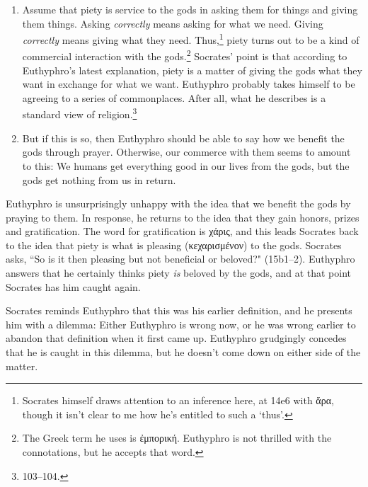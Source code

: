 \documentclass[11pt]{article}
\begin{document}
\begin{enumerate}

    \item Assume that piety is service to the gods in asking them for
        things and giving them things.  Asking \emph{correctly} means
        asking for what we need.  Giving \emph{correctly} means giving what
        they need.  Thus,\footnote{Socrates himself draws attention to an
        inference here, at 14e6 with {\g ἄρα}, though it isn't clear to
        me how he's entitled to such a `thus'.} piety turns out to be
        a kind of commercial interaction with the gods.\footnote{The Greek
        term he uses is {\g ἐμπορική}.  Euthyphro is not thrilled with
        the connotations, but he accepts that word.}  Socrates' point is
        that according to Euthyphro's latest explanation, piety is a matter
        of giving the gods what they want in exchange for what we want.
        Euthyphro probably takes himself to be agreeing to a series of
        commonplaces.  After all, what he describes is a standard
         view of religion.\footnote{\citet{bailly2003}
        103--104.}

    \item But if this is so, then Euthyphro should be able to say how we
        benefit the gods through prayer.  Otherwise, our commerce with them
        seems to amount to this: We humans get everything good in our lives
        from the gods, but the gods get nothing from us in return.

\end{enumerate}

Euthyphro is unsurprisingly unhappy with the idea that we benefit the gods
by praying to them. In response, he returns to the idea that they gain
honors, prizes and gratification.  The word for gratification is {\g
χάρις}, and this leads Socrates back to the idea that piety is what is
pleasing ({\g κεχαρισμένον}) to the gods.  Socrates asks, ``So is it then
pleasing but not beneficial or beloved?" (15b1--2).  Euthyphro answers that
he certainly thinks piety \emph{is} beloved by the gods, and at that point
Socrates has him caught again.

Socrates reminds Euthyphro that this was his earlier definition, and he
presents him with a dilemma: Either Euthyphro is wrong now, or he was wrong
earlier to abandon that definition when it first came up.  Euthyphro
grudgingly concedes that he is caught in this dilemma, but he doesn't come
down on either side of the matter.
\end{document}
